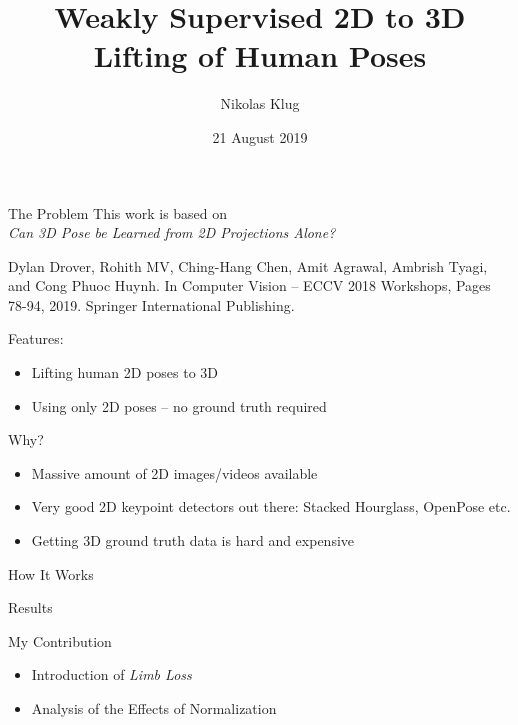 \documentclass[8pt]{beamer}
\title[]{Weakly Supervised 2D to 3D Lifting of Human Poses}
\author[Nikolas Klug]{Nikolas Klug}
\institute[University of Augsburg]{University of Augsburg}
\date{21 August 2019}
\begin{document}
	\frame{\titlepage}
	
	\begin{frame}[t]{The Problem}
		This work is based on \\
		\vspace{5pt}
		\emph{Can 3D Pose be Learned from 2D Projections Alone?}\linebreak
		\begin{footnotesize}
			Dylan Drover, Rohith MV, Ching-Hang Chen, Amit Agrawal, Ambrish Tyagi, and Cong Phuoc Huynh.\linebreak
			In Computer Vision -- ECCV 2018 Workshops, Pages 78-94, 2019. Springer International Publishing.\par
		\end{footnotesize}
		\vspace{2cm}
		Features:
		\begin{itemize}
			\item Lifting human 2D poses to 3D
			\item Using only 2D poses -- no ground truth required
		\end{itemize}
	\end{frame}

	\begin{frame}{Why?}
		\begin{itemize}
			\item Massive amount of 2D images/videos available
			\item Very good 2D keypoint detectors out there: Stacked Hourglass, OpenPose etc.
			\item Getting 3D ground truth data is hard and expensive
		\end{itemize}
	\end{frame}

	\begin{frame}{How It Works}
		
	\end{frame}

	\begin{frame}{Results}
		
	\end{frame}
	
	\begin{frame}{My Contribution}
		\begin{itemize}
			\item Introduction of \emph{Limb Loss}
			\item Analysis of the Effects of Normalization
		\end{itemize}
	\end{frame}
	
	
\end{document}
